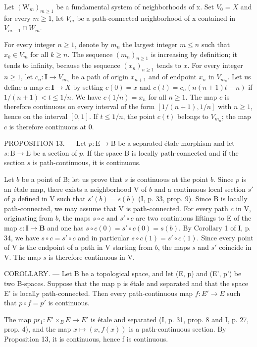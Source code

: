 Let \((\mathrm{W}_{m})_{m\geqslant1}\) be a fundamental system of neighborhoods of x. Set \(V_{0}=X\) and for every \(m\geqslant1\), let \(V_{m}\) be a path-connected neighborhood of x contained in \(V_{m-1}\cap W_{m}\).

For every integer \(n \geqslant 1\), denote by \(m_n\) the largest integer \(m \leqslant n\) such that \(x_k \in V_m\) for all \(k \geqslant n\). The sequence \((m_n)_{n \geqslant 1}\) is increasing by definition; it tends to infinity, because the sequence \((x_n)_{n \geqslant 1}\) tends to \(x\). For every integer \(n \geqslant 1\), let \(c_n: \mathbf{I} \to V_{m_n}\) be a path of origin \(x_{n+1}\) and of endpoint \(x_n\) in \(V_{m_n}\). Let us define a map \(c: \mathbf{I} \to X\) by setting \(c(0) = x\) and \(c(t) = c_n(n(n+1)t - n)\) if \(1/(n+1) < t \leqslant 1/n\). We have \(c(1/n) = x_n\) for all \(n \geqslant 1\). The map \(c\) is therefore continuous on every interval of the form \([1/(n+1), 1/n]\) with \(n \geqslant 1\), hence on the interval \([0,1]\). If \(t \leqslant 1/n\), the point \(c(t)\) belongs to \(V_{m_n}\); the map \(c\) is therefore continuous at 0.

PROPOSITION 13. --- Let \(p \colon \mathrm{E} \to \mathrm{B}\) be a separated étale morphism and let \(s \colon \mathrm{B} \to \mathrm{E}\) be a section of \(p\). If the space B is locally path-connected and if the section \(s\) is path-continuous, it is continuous.

Let \(b\) be a point of B; let us prove that \(s\) is continuous at the point \(b\). Since \(p\) is an étale map, there exists a neighborhood V of \(b\) and a continuous local section \(s'\) of \(p\) defined in V such that \(s'(b) = s(b)\) (I, p. 33, prop. 9). Since B is locally path-connected, we may assume that V is path-connected. For every path \(c\) in V, originating from \(b\), the maps \(s \circ c\) and \(s' \circ c\) are two continuous liftings to E of the map \(c \colon \mathbf{I} \to \mathbf{B}\) and one has \(s \circ c(0) = s' \circ c(0) = s(b)\). By Corollary 1 of I, p. 34, we have \(s \circ c = s' \circ c\) and in particular \(s \circ c(1) = s' \circ c(1)\). Since every point of V is the endpoint of a path in V starting from \(b\), the maps \(s\) and \(s'\) coincide in V. The map \(s\) is therefore continuous in V.

COROLLARY. --- Let B be a topological space, and let (E, p) and (E', p') be two B-spaces. Suppose that the map p is étale and separated and that the space E' is locally path-connected. Then every path-continuous map \(f: E' \to E\) such that \(p \circ f = p'\) is continuous.

The map \(pr_{1}: E'\times_{B} E \rightarrow E'\) is étale and separated (I, p. 31, prop. 8 and I, p. 27, prop. 4), and the map \(x \mapsto (x, f(x))\) is a path-continuous section. By Proposition 13, it is continuous, hence f is continuous.

